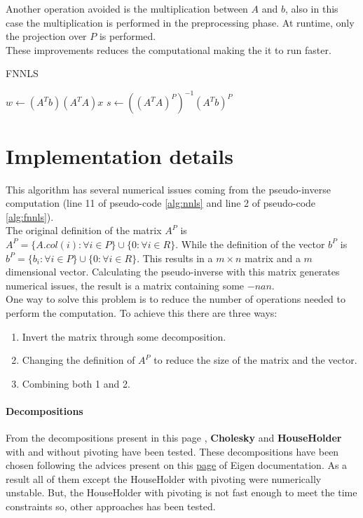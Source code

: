 Another operation avoided is the multiplication between $A$ and $b$, also in this case the multiplication is performed in the preprocessing phase. At runtime, only the projection over $P$ is performed. \\
These improvements reduces the computational making the it to run faster. 
\begin{algorithm}[h]
  \caption{FNNLS}
  \label{alg:fnnls}
  \begin{algorithmic}[1]
    \State $w \gets (A^T b) (A^T A)x $
    \State $s \gets ((A^TA)^P)^{-1} (A^Tb)^P$
  \end{algorithmic}
\end{algorithm}
\section{Implementation details}
This algorithm has several numerical issues coming from the pseudo-inverse computation (line 11 of pseudo-code \ref{alg:nnls} and line 2 of pseudo-code \ref{alg:fnnls}). \\
The original definition of the matrix $A^P$ is $A^P=\{A.col(i) : \forall i \in P\} \cup \{0: \forall i \in R\}$. While the definition of the vector $b^P$ is $b^P=\{b_i : \forall i \in P\} \cup \{0: \forall i \in R\}$. This results in a $m \times n$ matrix and a $m$ dimensional vector. Calculating the pseudo-inverse with this matrix generates numerical issues, the result is a matrix containing some $-nan$.\\
One way to solve this problem is to reduce the number of operations needed to perform the computation. To achieve this there are three ways:
\begin{enumerate}
  \item Invert the matrix through some decomposition.
  \item Changing the definition of $A^P$ to reduce the size of the matrix and the vector.
  \item Combining both 1 and 2.
\end{enumerate}
\paragraph{Decompositions}
From the decompositions present in this page \cite{wiki:Matrix_decomposition}, \textbf{Cholesky} and \textbf{HouseHolder} with and without pivoting have been tested. These decompositions have been chosen following the advices present on this \href{https://eigen.tuxfamily.org/dox/group__LeastSquares.html}{page} of Eigen documentation. As a result all of them except the HouseHolder with pivoting were numerically unstable. But, the HouseHolder with pivoting is not fast enough to meet the time constraints so, other approaches has been tested.
